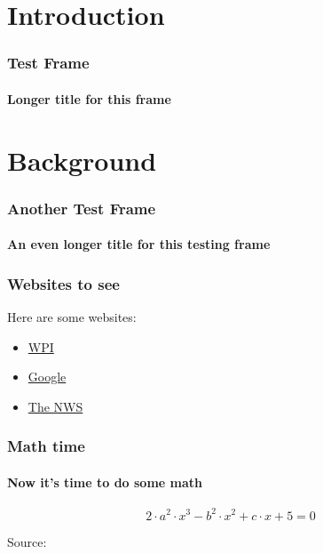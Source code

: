 



\section{Introduction}

\begin{frame}[label=TESTFRAME]
\frametitle{Test Frame}
\framesubtitle{Longer title for this frame}

\lipsum[4]

\end{frame}



\section{Background}

\begin{frame}[label=TESTFRAME2]
\frametitle{Another Test Frame}
\framesubtitle{An even longer title for this testing frame}

\lipsum[4]

\end{frame}


\begin{frame}[label=URLFRAME]
\frametitle{Websites to see}

Here are some websites:

\begin{itemize}
    \item \href{https://www.wpi.edu}{WPI}
    \item \href{https://google.com}{Google}
    \item \href{http://www.weather.gov}{The NWS}
\end{itemize}


\end{frame}


\begin{frame}[label=MATHFRAME]
\frametitle{Math time}
\framesubtitle{Now it's time to do some math}

\lipsum[2]

\begin{equation}
2 \cdot a^{2} \cdot x^{3} - b^{2} \cdot x^{2} + c \cdot x + 5 = 0
\end{equation}

Source: \cite{LaValle}


\end{frame}




